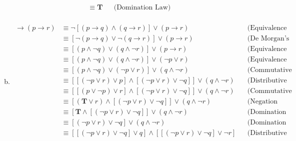 \begin{itemize}
\begin{enumerate}[a.]
\begin{align*}
                         & \equiv \mathbf{T}                                                   &  & \text{(Domination Law)}                      \\
                    \end{align*}
              \item  \begin{align*}
                        [(p \to  q)  \land  (q \to r)] \to (p \to r)
                         & \equiv \neg [(p \to q) \land (q \to r)] \lor (p \to r)                                          &  & \text{(Equivalence from table)}         \\
                         & \equiv [\neg (p \to q) \lor \neg (q \to r)] \lor (p \to r)                                      &  & \text{(De Morgan's Law)}                \\
                         & \equiv [(p \land \neg q) \lor (q \land \neg r)] \lor (p \to r)                                  &  & \text{(Equivalence from table)}         \\
                         & \equiv [(p \land \neg q) \lor (q \land \neg r)] \lor (\neg p \lor r)                            &  & \text{(Equivalence from table)}         \\
                         & \equiv [(p \land \neg q) \lor (\neg p \lor r)] \lor (q \land \neg r)                            &  & \text{(Commutative \& Associative Law)} \\
                         & \equiv [[(\neg p \lor r) \lor p] \land [(\neg p \lor r) \lor \neg q]] \lor (q \land \neg r)     &  & \text{(Distributive Law)}               \\
                         & \equiv [[(p \lor \neg p) \lor r] \land [(\neg p \lor r) \lor \neg q]] \lor (q \land \neg r)     &  & \text{(Commutative \& Associative Law)} \\
                         & \equiv [(\mathbf{T} \lor r) \land [(\neg p \lor r) \lor \neg q]] \lor (q \land \neg r)          &  & \text{(Negation Law)}                   \\
                         & \equiv [\mathbf{T} \land [(\neg p \lor r) \lor \neg q]] \lor (q \land \neg r)                   &  & \text{(Domination Law)}                 \\
                         & \equiv [(\neg p \lor r) \lor \neg q] \lor (q \land \neg r)                                      &  & \text{(Domination Law)}                 \\
                         & \equiv [[(\neg p \lor r) \lor \neg q] \lor q] \land [[(\neg p \lor r) \lor \neg q] \lor \neg r] &  & \text{(Distributive Law)}               \\

\end{align*}
\end{enumerate}
\end{itemize}
